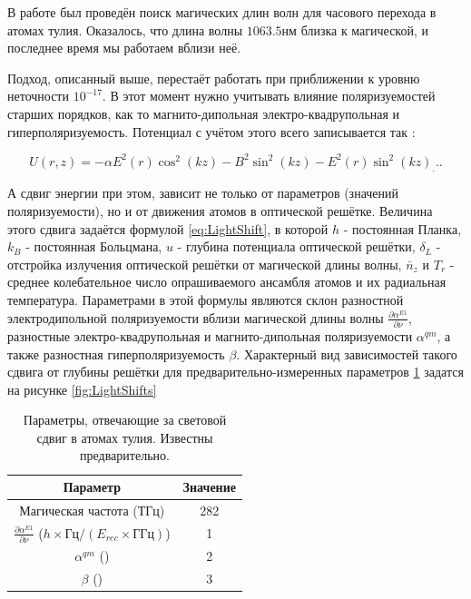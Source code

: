В работе \cite{} был проведён поиск магических длин волн для часового перехода в атомах тулия. 
Оказалось, что длина волны $1063.5\unit{нм}$ близка к магической, и последнее время мы работаем вблизи неё. 

Подход, описанный выше, перестаёт работать при приближении к уровню неточности $10^{-17}$. 
В этот момент нужно учитывать влияние поляризуемостей старших порядков, как то магнито-дипольная электро-квадрупольная и гиперполяризуемость.
Потенциал с учётом этого всего записывается так \cite{ushijima2018operational}:  

\begin{equation}
	\label{eq:LatticePotential2_app} 
	U(r, z) = -\alpha E^2 (r) \cos^2(kz) - B^2 \sin^2 (kz) - E^2 (r) \sin^2 (kz) _ ...  
\end{equation}

А сдвиг энергии при этом, зависит не только от параметров (значений поляризуемости), но и от движения атомов в оптической решётке.
Величина этого сдвига задаётся формулой \ref{eq:LightShift}, в которой $h$ - постоянная Планка, $k_B$ - постоянная Больцмана, $u$ - глубина потенциала оптической решётки, $\delta_L$ - отстройка излучения оптической решётки от магической длины волны, $\bar{n}_z$ и $T_r$ - среднее колебательное число опрашиваемого ансамбля атомов и их радиальная температура.
Параметрами в этой формулы являются склон разностной электродипольной поляризуемости вблизи магической длины волны $\frac{\partial \alpha^{E1}}{\partial\nu}$, разностные электро-квадрупольная и магнито-дипольная поляризуемости $\alpha^{qm}$, а также разностная гиперполяризуемость $\beta$.
Характерный вид зависимостей такого сдвига от глубины решётки для предварительно-измеренных параметров \ref{tab:LightShiftsParameters} задатся на рисунке \ref{fig:LightShifts}  

\begin{table}[]
	\centering
	\begin{tabular}{|cc|}
		\hline
		Параметр & Значение\\
		\hline
		Магическая частота (ТГц)																		&  282\\
		$\frac{\partial \alpha^{E1}}{\partial\nu}$ ($h\times\unit{Гц}/(E_{rec}\times\unit{ГГц})$)		&  1\\
		$\alpha^{qm}$ () 																				&  2\\
		$\beta$ ()																						&  3\\
		\hline
	\end{tabular}
	\caption{Параметры, отвечающие за световой сдвиг в атомах тулия. Известны предварительно.}
	\label{tab:LightShiftsParameters}
\end{table}

